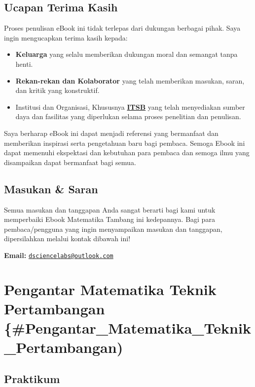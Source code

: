 \documentclass[
]{book}
\providecommand{\tightlist}{%
  \setlength{\itemsep}{0pt}\setlength{\parskip}{0pt}}
\begin{document}
\section*{Ucapan Terima Kasih}\label{ucapan-terima-kasih}

Proses penulisan eBook ini tidak terlepas dari dukungan berbagai pihak. Saya ingin mengucapkan terima kasih kepada:

\begin{itemize}
\tightlist
\item
  \textbf{Keluarga} yang selalu memberikan dukungan moral dan semangat tanpa henti.
\item
  \textbf{Rekan-rekan dan Kolaborator} yang telah memberikan masukan, saran, dan kritik yang konstruktif.
\item
  Institusi dan Organisasi, Khususnya \textbf{\href{https://itsb.ac.id/}{ITSB}} yang telah menyediakan sumber daya dan fasilitas yang diperlukan selama proses penelitian dan penulisan.
\end{itemize}

Saya berharap eBook ini dapat menjadi referensi yang bermanfaat dan memberikan inspirasi serta pengetahuan baru bagi pembaca. Semoga Ebook ini dapat memenuhi ekspektasi dan kebutuhan para pembaca dan semoga ilmu yang disampaikan dapat bermanfaat bagi semua.

\section*{Masukan \& Saran}\label{masukan-saran}

Semua masukan dan tanggapan Anda sangat berarti bagi kami untuk memperbaiki Ebook Matematika Tambang ini kedepannya. Bagi para pembaca/pengguna yang ingin menyampaikan masukan dan tanggapan, dipersilahkan melalui kontak dibawah ini!

\textbf{Email:} \href{mailto:dsciencelabs@outlook.com}{\nolinkurl{dsciencelabs@outlook.com}}

\chapter{Pengantar Matematika Teknik Pertambangan \{\#Pengantar\_Matematika\_Teknik\_Pertambangan)}\label{pengantar-matematika-teknik-pertambangan-pengantar_matematika_teknik_pertambangan}

\section{Praktikum}\label{praktikum}
\end{document}
